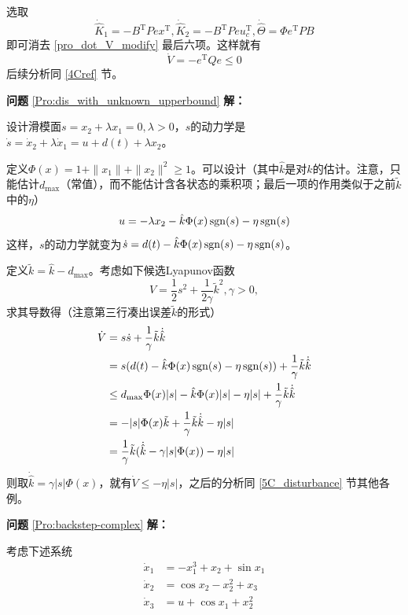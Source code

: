 选取
\[\dot{\hat{K}} _1 = -  B^\mathrm{T}  P  e  x^\mathrm{T}, \dot{\hat{K}} _2 = -  B^\mathrm{T}  P  e  u^\mathrm{T}_c,\dot{\hat{\Theta}}=\Phi e^\mathrm{T}PB\]
即可消去 \eqref{pro_dot_V_modify} 最后六项。这样就有
\[ \dot{V} = - e^\mathrm{T} Q  e \leq 0 \]
后续分析同 \ref{4Cref} 节。

\noindent\textbf{问题} \ref{Pro:dis_with_unknown_upperbound} \textbf{解：}

设计滑模面$s = x_2 + \lambda x_1 = 0,  \lambda > 0$，$s$的动力学是 $\dot{s} = \dot{x}_2 + \lambda \dot{x}_1 = u + d (t)
  + \lambda x_2$。

定义$\Phi(x)=1 + \| x_1 \| + \| x_2 \|^2\ge 1$。可以设计（其中$\hat{k}$是对$k$的估计。注意，只能估计$d_{\max}$（常值），而不能估计含各状态的乘积项；最后一项的作用类似于之前$\tilde{k}$中的$\eta$）
  \[ u = - \lambda x_2 - \hat{k}\Phi(x) \operatorname{sgn} (s) -\eta\operatorname{sgn}(s)\]
这样，$s$的动力学就变为$\dot{s}=d(t)-\hat{k}\Phi(x) \operatorname{sgn} (s)-\eta\operatorname{sgn}(s)$。

定义$\tilde{k}=\hat{k}-d_{\max}$。考虑如下候选Lyapunov函数
  \[ V = \frac{1}{2} s^2 + \frac{1}{2 \gamma} \tilde{k}^2, \gamma > 0, \]
  求其导数得（注意第三行凑出误差$\tilde{k}$的形式）
  \begin{align*}
    \dot{V} & = s  \dot{s} + \frac{1}{\gamma} \tilde{k} \dot{\hat{k}}\\
    &=s(d(t)-\hat{k}\Phi(x)\operatorname{sgn}(s)-\eta\operatorname{sgn}(s))+\frac{1}{\gamma} \tilde{k} \dot{\hat{k}}\\
    & \leq d_{\max}\Phi(x)|s|-\hat{k}\Phi(x)|s|-\eta|s|+\frac{1}{\gamma} \tilde{k} \dot{\hat{k}}\\
    & = -|s|\Phi(x)\tilde{k}+\frac{1}{\gamma} \tilde{k} \dot{\hat{k}}-\eta|s|\\
    &= \frac{1}{\gamma}\tilde{k} (\dot{\hat{k}}-\gamma |s|\Phi(x))-\eta|s|
  \end{align*}
则取$\dot{\hat{k}}=\gamma |s|\Phi(x)$，就有$\dot{V}\leq-\eta|s|$，之后的分析同 \ref{5C_disturbance} 节其他各例。

\noindent\textbf{问题} \ref{Pro:backstep-complex} \textbf{解：}

考虑下述系统 \begin{align*}
    \dot{x}_1 & = -x_1^3+ x_2+\sin x_1\\
    \dot{x}_2 & = \cos x_2-x_2^2 + x_3 \\
    \dot{x}_3 & = u +\cos x_1 +x_2^2
  \end{align*}


